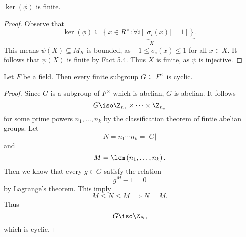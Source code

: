 \documentclass[pmath441]{subfiles}
\begin{document}
    \begin{prop}{}
        $\ker\left( \phi \right)$ is finite.
    \end{prop}

    \begin{proof}
        Observe that
        \begin{equation*}
            \ker\left( \phi \right) \subseteq \underbrace{\left\lbrace x\in R^{\times}:\forall i\left[ \left| \sigma_i\left( x \right) \right| = 1 \right] \right\rbrace}_{=X}.
        \end{equation*}
        This means $\psi\left( X \right)\subseteq M_K$ is bounded, as $-1\leq\sigma_i\left( x \right)\leq 1$ for all $x\in X$. It follows that $\psi\left( X \right)$ is finite by Fact 5.4. Thus $X$ is finite, as $\psi$ is injective.
    \end{proof}
    
    \begin{prop}{}
        Let $F$ be a field. Then every finite subgroup $G\subseteq F^\times$ is cyclic.
    \end{prop}

    \begin{proof}
        Since $G$ is a subgroup of $F^{\times}$ which is abelian, $G$ is abelian. It follows
        \begin{equation*}
            G\iso \Z_{n_1}\times\cdots\times\Z_{n_k}
        \end{equation*}
        for some prime powers $n_1,\ldots,n_k$ by the classification theorem of fintie abelian groups. Let
        \begin{equation*}
            N = n_1\cdots n_k = \left| G \right|
        \end{equation*}
        and
        \begin{equation*}
            M = \lcm\left( n_1,\ldots,n_k \right).
        \end{equation*}
        Then we know that every $g\in G$ satisfy the relation
        \begin{equation*}
            g^M-1 = 0
        \end{equation*}
        by Lagrange's theorem. This imply
        \begin{equation*}
            M\leq N\leq M \implies N=M.
        \end{equation*}
        Thus
        \begin{equation*}
            G\iso\Z_N,
        \end{equation*}
        which is cyclic.
    \end{proof}
\end{document}
